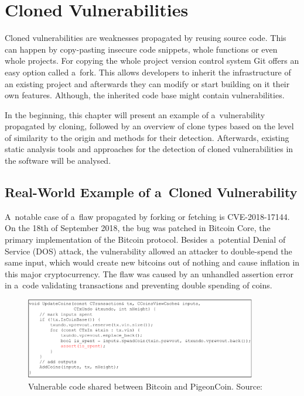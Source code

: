 
\chapter{Cloned Vulnerabilities}
\label{chapter:clonedVulnerabilities}
Cloned vulnerabilities are weaknesses propagated by reusing source code. This can happen by copy-pasting
insecure code snippets, whole functions or even whole projects. For copying the whole project version control system
Git offers an easy option called a~fork. This allows developers to inherit the infrastructure of an existing project
and afterwards they can modify or start building on it their own features. Although, the inherited code base might
contain vulnerabilities.

In the beginning, this chapter will present an example of a~vulnerability propagated by cloning, followed by
an overview of clone types based on the level of similarity to the origin and methods for their detection. Afterwards,
existing static analysis tools and approaches for the detection of cloned vulnerabilities in the software
will be analysed.

\section{Real-World Example of a~Cloned Vulnerability}
\label{sec:example-cloned-vuln}
  A~notable case of a~flaw propagated by forking or fetching is CVE-2018-17144. On the 18th of September 2018, the bug
  was patched in Bitcoin Core, the primary implementation of the Bitcoin protocol. Besides a~potential Denial of Service (DOS)
  attack, the vulnerability allowed an attacker to double-spend the same input, which would create new bitcoins out of nothing
  and cause inflation in this major cryptocurrency. The flaw was caused by an unhandled assertion error in a~code validating
  transactions and preventing double spending of coins.~\cite{BTCInflationBug, HackerNoonBTCInflationBug}

  \begin{figure}[h]
    \centering
    \includegraphics[width=0.9\textwidth]{obrazky-figures/cve-2018-17144_code.drawio.pdf}
    \caption{Vulnerable code shared between Bitcoin and PigeonCoin. Source:~\cite{BTCInflationBug}}
    \label{cve201817144code}
  \end{figure}

